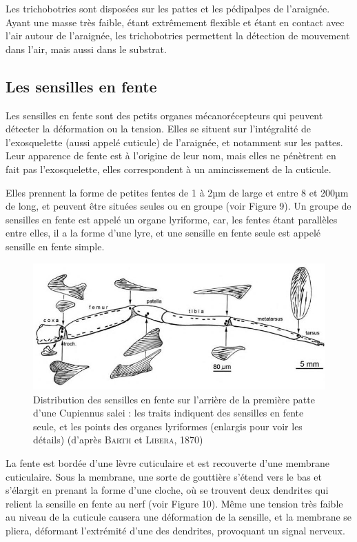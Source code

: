 Les trichobotries sont disposées sur les pattes et les pédipalpes de
l'araignée. Ayant une masse très faible, étant extrêmement flexible et
étant en contact avec l'air autour de l'araignée, les trichobotries
permettent la détection de mouvement dans l'air, mais aussi dans le
substrat.

\subsection{Les sensilles en fente}

Les sensilles en fente sont des petits organes mécanorécepteurs qui
peuvent détecter la déformation ou la tension. Elles se situent sur
l'intégralité de l'exosquelette (aussi appelé cuticule) de l'araignée,
et notamment sur les pattes. Leur apparence de fente est à l'origine de
leur nom, mais elles ne pénètrent en fait pas l'exosquelette, elles
correspondent à un amincissement de la cuticule.

Elles prennent la forme de petites fentes de 1 à 2µm de large et entre 8
et 200µm de long, et peuvent être situées seules ou en groupe (voir
Figure 9). Un groupe de sensilles en fente est appelé un organe
lyriforme, car, les fentes étant parallèles entre elles, il a la forme
d'une lyre, et une sensille en fente seule est appelé sensille en fente
simple.

\begin{figure}[htb!]
	\centering
	\includegraphics[width=0.7\linewidth]{../img/vibrations/Sensilles}
	\caption{Distribution des sensilles en fente sur l'arrière
		de la première patte d'une Cupiennus salei : les traits indiquent des
		sensilles en fente seule, et les points des organes lyriformes (enlargis
		pour voir les détails) (d'après \textsc{Barth} et \textsc{Libera},
		1870)}
	\label{fig:Sensilles}
\end{figure}

La fente est bordée d'une lèvre cuticulaire et est recouverte d'une
membrane cuticulaire. Sous la membrane, une sorte de gouttière s'étend
vers le bas et s'élargit en prenant la forme d'une cloche, où se
trouvent deux dendrites qui relient la sensille en fente au nerf (voir
Figure 10). Même une tension très faible au niveau de la cuticule
causera une déformation de la sensille, et la membrane se pliera,
déformant l'extrémité d'une des dendrites, provoquant un signal nerveux.

